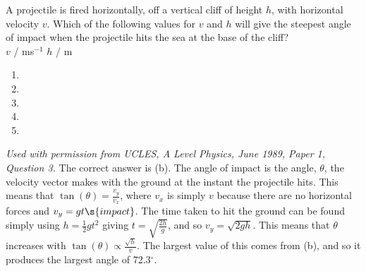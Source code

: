 \begin{problem}[A1989PIQ3l] 
{A projectile is fired horizontally, off a vertical cliff of height $h$, with horizontal velocity $v$. Which of the following values for $v$ and $h$ will give the steepest angle of impact when the projectile hits the sea at the base of the cliff?\\

\quad\quad\quad $v$ / ms$^{-1}$ \quad\quad $h$ / m
\begin{enumerate}
	\item \quad\quad{} \quad\quad\quad\quad\quad 30
	\item \quad\quad{} \quad\quad\quad\quad\quad 50
	\item \quad\quad{} \quad\quad\quad\quad{}
	\item \quad\quad{} \quad\quad\quad\quad{}
	\item \quad\quad{} \quad\quad\quad\quad\quad 10
\end{enumerate}
}
{\textit{Used with permission from UCLES, A Level Physics, June 1989, Paper 1, Question 3.}}
{The correct answer is (b). The angle of impact is the angle, $\theta$, the velocity vector makes with the ground at the instant the projectile hits. This means that $\tan(\theta) = \frac{v_{y}}{v_{x}}$, where $v_{x}$ is simply $v$ because there are no horizontal forces and $v_{y} = gt\s{impact}$. The time taken to hit the ground can be found simply using $h = \frac{1}{2}gt^{2}$ giving $t = \sqrt{\frac{2h}{g}}$, and so $v_{y} = \sqrt{2gh}$. This means that $\theta$ increases with $\tan(\theta) \propto \frac{\sqrt{h}}{v}$. The largest value of this comes from (b), and so it produces the largest angle of 72.3$^{\circ}$.
}
\end{problem}